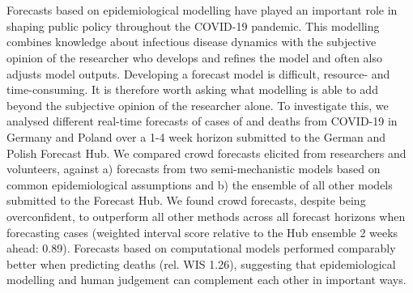 \documentclass[10pt,letterpaper]{article} %
\providecommand{\DIFaddtex}[1]{{\protect\color{blue}\uwave{#1}}} %
\providecommand{\DIFaddend}{} %
\providecommand{\DIFdelbegin}{} %
\providecommand{\DIFadd}[1]{\texorpdfstring{\DIFaddtex{#1}}{#1}} %
\newcommand{\DIFscaledelfig}{0.5}
\newlength{\DIFdelgraphicswidth} %
\newlength{\DIFdelgraphicsheight} %
\newcommand{\DIFdelincludegraphics}[2][]{%
\sbox{\DIFdelgraphicsbox}{\DIFOincludegraphics[#1]{#2}}%
\settoboxwidth{\DIFdelgraphicswidth}{\DIFdelgraphicsbox} %
\settoboxtotalheight{\DIFdelgraphicsheight}{\DIFdelgraphicsbox} %
\scalebox{\DIFscaledelfig}{%
\parbox[b]{\DIFdelgraphicswidth}{\usebox{\DIFdelgraphicsbox}\\[-\baselineskip] \rule{\DIFdelgraphicswidth}{0em}}\llap{\resizebox{\DIFdelgraphicswidth}{\DIFdelgraphicsheight}{%
\setlength{\unitlength}{\DIFdelgraphicswidth}%
\begin{picture}(1,1)%
\thicklines\linethickness{2pt} %
{\color[rgb]{1,0,0}\put(0,0){\framebox(1,1){}}}%
{\color[rgb]{1,0,0}\put(0,0){\line( 1,1){1}}}%
{\color[rgb]{1,0,0}\put(0,1){\line(1,-1){1}}}%
\end{picture}%
}\hspace*{3pt}}} %
} %
\DeclareRobustCommand{\DIFaddend}{\DIFOaddend \let\includegraphics\DIFOincludegraphics} %
\DeclareRobustCommand{\DIFdelbegin}{\DIFOdelbegin \let\includegraphics\DIFdelincludegraphics} %
\begin{document}
\section*{\DIFadd{Abstract}}
\DIFaddend Forecasts based on epidemiological modelling have played an important
role in shaping public policy throughout the COVID-19 pandemic. This
modelling combines knowledge about infectious disease dynamics with the
subjective opinion of the researcher who develops and refines the model
and often also adjusts model outputs. Developing a forecast model is
difficult, resource- and time-consuming. It is therefore worth asking
what modelling is able to add beyond the subjective opinion of the
researcher alone. To investigate this, we analysed different real-time
forecasts of cases of and deaths from COVID-19 in Germany and Poland
over a 1-4 week horizon submitted to the German and Polish Forecast Hub.
We compared crowd forecasts elicited from researchers and volunteers,
against a) forecasts from two semi-mechanistic models based on common
epidemiological assumptions and b) the ensemble of all other models
submitted to the Forecast Hub. We found crowd forecasts, despite being
overconfident, to outperform all other methods across all forecast
horizons when forecasting cases (weighted interval score relative to the
Hub ensemble 2 weeks ahead: 0.89). Forecasts based on computational
models performed comparably better when predicting deaths (rel. WIS
1.26), suggesting that epidemiological modelling and human judgement can
complement each other in important ways.

\DIFdelbegin %
\end{document}
